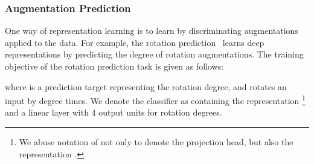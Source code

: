 \documentclass{article} \usepackage{iclr2021_conference,times}
\begin{document}
\begin{table}[t]
    \centering
    \vspace{-0.05in}
    \caption{A comparison between one-class classifiers based on self-supervised learning. Previous works~\cite{golan2018deep,hendrycks2019using} train one-class classifiers using augmentation prediction with geometric transformations (e.g. ) and determine outliers using augmentation classifiers (). We learn representations using proxy tasks of different self-supervised learning methods, such as contrastive learning (), and build simple one-class classifiers, such as KDE or OC-SVM, on learned inlier representations.}
    \label{tab:algo_compare}
    \vspace{-0.2in}
\end{table}


\subsubsection{Augmentation Prediction}
\label{sec:augmentation_prediction}
\vspace{-0.05in}
One way of representation learning is to learn by discriminating augmentations applied to the data.
For example, the rotation prediction~\citep{gidaris2018unsupervised} learns deep representations by predicting the degree of rotation augmentations. The training objective of the rotation prediction task is given as follows:

where  is a prediction target representing the rotation degree, and  rotates an input  by  degree  times. We denote the classifier  as  containing the representation \footnote{We abuse notation of  not only to denote the projection head, but also the representation .} and a linear layer  with 4 output units for rotation degrees. 
\end{document}
